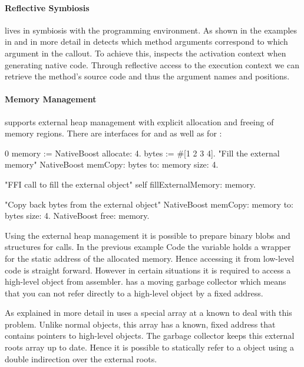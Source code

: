 \paragraph{Reflective Symbiosis}

\NB lives in symbiosis with the \PH programming environment.
As shown in the examples in  and in more detail in  \NB detects which method arguments correspond to which argument in the \FFI callout.
To achieve this, \NB inspects the activation context when generating native code.
Through reflective access to the execution context we can retrieve the method's source code and thus the argument names and positions.

\paragraph{Memory Management}
\NB supports external heap management with explicit allocation and freeing of memory regions.
There are interfaces for  and  as well as for :
%
\begin{stcode}[
	label={lst:ffi-externalHeap},
	caption={Example of external heap management in \NB}]{0}
memory := NativeBoost allocate: 4.
bytes  := #[1 2 3 4].
"Fill the external memory"
NativeBoost memCopy: bytes to: memory size: 4.

"FFI call to fill the external object"
self fillExternalMemory: memory.

"Copy back bytes from the external object"
NativeBoost memCopy: memory to: bytes size: 4.
NativeBoost free: memory.
\end{stcode}

\noindent Using the external heap management it is possible to prepare binary blobs and structures for \FFI calls.
In the previous example Code  the  variable holds a wrapper for the static address of the allocated memory.
Hence accessing it from low-level code is straight forward.
However in certain situations it is required to access a high-level object from assembler.
\PH has a moving garbage collector which means that you can not refer directly to a high-level object by a fixed address.

As explained in more detail in  \B uses a special array at a known to deal with this problem.
Unlike normal \PH objects, this array has a known, fixed address that contains pointers to high-level objects.
The garbage collector keeps this external roots array up to date.
Hence it is possible to statically refer to a \PH object using a double indirection over the external roots.



